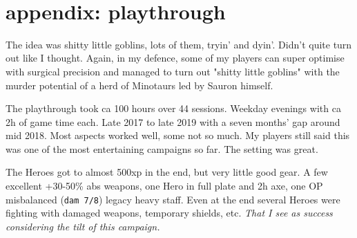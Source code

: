 \







































\clearpage
\section*{appendix: playthrough}

\raggedbottom

\begin{readoutloud}
The idea was shitty little goblins, lots of them, tryin' and dyin'. Didn't quite turn out like I thought. Again, in my defence, some of my players can super optimise with surgical precision and managed to turn out "shitty little goblins" with the murder potential of a herd of Minotaurs led by Sauron himself.
\end{readoutloud}

\noindent The playthrough took ca 100 hours over 44 sessions. Weekday evenings with ca 2h of game time each. Late 2017 to late 2019 with a seven months' gap around mid 2018. Most aspects worked well, some not so much. My players still said this was one of the most entertaining campaigns so far. The setting was great.

The Heroes got to almost 500xp in the end, but very little good gear. A few excellent +30-50\% abs weapons, one Hero in full plate and 2h axe, one OP misbalanced (\texttt{dam 7/8}) legacy heavy staff. Even at the end several Heroes were fighting with damaged weapons, temporary shields, etc. \emph{That I see as success considering the tilt of this campaign.}

